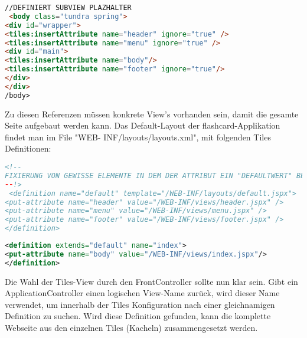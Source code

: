 \documentclass[a4paper,10pt]{scrreprt}
\begin{document}
\begin{lstlisting}[language=html,caption=CompositeView mit Tiles(default.jspx)]
//DEFINIERT SUBVIEW PLAZHALTER
 <body class="tundra spring">
<div id="wrapper">
<tiles:insertAttribute name="header" ignore="true" />
<tiles:insertAttribute name="menu" ignore="true" />
<div id="main">
<tiles:insertAttribute name="body"/>
<tiles:insertAttribute name="footer" ignore="true"/>
</div>
</div>
/body>
\end{lstlisting}
Zu diesen Referenzen müssen konkrete View's vorhanden sein, damit die gesamte Seite aufgebaut
werden kann. Das Default-Layout der flashcard-Applikation findet man im File "WEB-
INF/layouts/layouts.xml", mit folgenden Tiles Definitionen:

\begin{lstlisting}[language=xml,caption=Layout Beschreibung]
<!--
FIXIERUNG VON GEWISSE ELEMENTE IN DEM DER ATTRIBUT EIN "DEFAULTWERT" BEKOMMT
--!>
 <definition name="default" template="/WEB-INF/layouts/default.jspx">
<put-attribute name="header" value="/WEB-INF/views/header.jspx" /> 
<put-attribute name="menu" value="/WEB-INF/views/menu.jspx" />
<put-attribute name="footer" value="/WEB-INF/views/footer.jspx" />
</definition>

\end{lstlisting}

\begin{lstlisting}[caption=Auszug aus views.xml,language=xml]
 <definition extends="default" name="index">
<put-attribute name="body" value="/WEB-INF/views/index.jspx"/>
</definition>
\end{lstlisting}
\begin{framed}
 Die Wahl der Tiles-View durch den FrontController sollte nun klar sein. Gibt ein ApplicationController
einen logischen View-Name zurück, wird dieser Name verwendet, um innerhalb der Tiles
Konfiguration nach einer gleichnamigen Definition zu suchen. Wird diese Definition gefunden, kann
die komplette Webseite aus den einzelnen Tiles (Kacheln) zusammengesetzt werden.
\end{framed}
\end{document}
